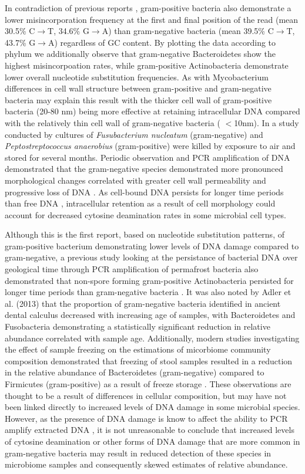 \documentclass[12pt, a4paper]{article}
\begin{document}
In contradiction of previous reports \cite{Weyrich:2017aa,Ziesemer:2015aa}, 
gram-positive bacteria also demonstrate a lower misincorporation frequency at the first and final position of the read (mean 30.5\% C$\to$T, 34.6\% G$\to$A) than gram-negative bacteria (mean 39.5\% C$\to$T, 43.7\% G$\to$A) regardless of GC content.
By plotting the data according to phylum we additionally observe that gram-negative Bacteroidetes show the highest misincorpoation rates, while gram-positive Actinobacteria demonstrate lower overall nucleotide substitution frequencies. 
As with Mycobacterium differences in cell wall structure between gram-positive and gram-negative bacteria may explain this result with the thicker cell wall of gram-positive bacteria (20-80 nm) being more effective at retaining intracellular DNA compared with the relatively thin cell wall of gram-negative bacteria ( $<$10nm).
In a study conducted by  cultures of \textit{Fusubacterium nucleatum} (gram-negative) and \textit{Peptostreptococcus anaerobius} (gram-positive) were killed by exposure to air and stored for several months. 
Periodic observation and PCR amplification of DNA demonstrated that the gram-negative species demonstrated more pronounced morphological changes correlated with greater cell wall permeability and progressive loss of DNA \cite{Brundin:2015aa}.
As cell-bound DNA persists for longer time periods than free DNA \cite{Brundin:2013aa}, intracellular retention as a result of cell morphology could account for decreased cytosine deamination rates in some microbial cell types.

Although this is the first report, based on nucleotide substitution patterns, of gram-positive bacterium demonstrating lower levels of DNA damage compared to gram-negative, a previous study looking at the persistance of bacterial DNA over geological time through PCR amplification of permafrost bacteria also demonstrated that non-spore forming gram-positive Actinobacteria persisted for longer time periods than gram-negative bacteria \cite{Willerslev:2004aa}.
It was also noted by Adler et al. (2013) that the proportion of gram-negative bacteria identified in ancient dental calculus decreased with increasing age of samples, with Bacteroidetes and Fusobacteria demonstrating a statistically significant reduction in relative abundance correlated with sample age. 
Additionally, modern studies investigating the effect of sample freezing on the estimations of micorbiome community composition demonstrated that freezing of stool samples resulted in a reduction in the relative abundance of Bacteroidetes (gram-negative) compared to Firmicutes (gram-positive) as a result of freeze storage \cite{Bahl:2012aa}. 
These observations are thought to be a result of differences in cellular composition, but may have not been linked directly to increased levels of DNA damage in some microbial species. 
However, as the presence of DNA damage is know to affect the ability to PCR amplify extracted DNA \cite{Hoss:1996aa}, it is not unreasonable to conclude that increased levels of cytosine deamination or other forms of DNA damage that are more common in gram-negative bacteria may result in reduced detection of these species in microbiome samples and consequently skewed estimates of relative abundance. 
\end{document}
